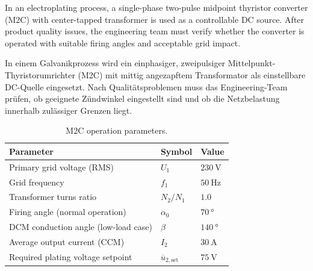 

In an electroplating process, a single-phase two-pulse midpoint thyristor converter (M2C)
with center-tapped transformer is used as a controllable DC source.
After product quality issues, the engineering team must verify whether the converter is operated
with suitable firing angles and acceptable grid impact.

\begin{germanblock}
    In einem Galvanikprozess wird ein einphasiger, zweipulsiger Mittelpunkt-Thyristorumrichter (M2C)
    mit mittig angezapftem Transformator als einstellbare DC-Quelle eingesetzt.
    Nach Qualitätsproblemen muss das Engineering-Team prüfen, ob geeignete Zündwinkel eingestellt sind
    und ob die Netzbelastung innerhalb zulässiger Grenzen liegt.
\end{germanblock}



\begin{table}[ht]
    \centering
    \begin{tabular}{lll}
        \toprule
        Parameter                            & Symbol                          & Value               \\
        \midrule
        Primary grid voltage (RMS)           & $U_1$                           & $\SI{230}{\volt}$   \\
        Grid frequency                       & $f_1$                           & $\SI{50}{\hertz}$   \\
        Transformer turns ratio              & $N_2/N_1$                       & $1.0$               \\
        Firing angle (normal operation)      & $\alpha_0$                      & $\SI{70}{\degree}$  \\
        DCM conduction angle (low-load case) & $\beta$                         & $\SI{140}{\degree}$ \\
        Average output current (CCM)         & $I_2$                           & $\SI{30}{\ampere}$  \\
        Required plating voltage setpoint    & $\overline{u}_{2,\mathrm{set}}$ & $\SI{75}{\volt}$    \\
        \bottomrule
    \end{tabular}
    \caption{M2C operation parameters.}
    \label{tab:task03_parameters}
\end{table}

